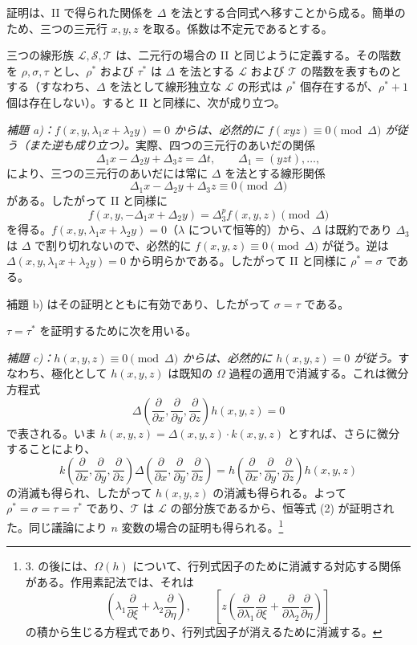 証明は、II で得られた関係を $\Delta$ を法とする合同式へ移すことから成る。簡単のため、三つの三元行 $x,y,z$ を取る。係数は不定元であるとする。

三つの線形族 $\mathcal L,\mathcal S,\mathcal T$ は、二元行の場合の II と同じように定義する。その階数を $\rho,\sigma,\tau$ とし、$\rho^*$ および $\tau^*$ は $\Delta$ を法とする $\mathcal L$ および $\mathcal T$ の階数を表すものとする（すなわち、$\Delta$ を法として線形独立な $\mathcal L$ の形式は $\rho^*$ 個存在するが、$\rho^*+1$ 個は存在しない）。すると II と同様に、次が成り立つ。

\emph{補題 a)：$f(x,y,\lambda_1x+\lambda_2y)=0$ からは、必然的に $f(xyz)\equiv0\pmod{\Delta}$ が従う（また逆も成り立つ）。}実際、四つの三元行のあいだの関係
\[
  \Delta_1x-\Delta_2y+\Delta_3z=\Delta t,
  \qquad \Delta_1=(yzt),\ldots,
\]
により、三つの三元行のあいだには常に $\Delta$ を法とする線形関係
\[
  \Delta_1x-\Delta_2y+\Delta_3z\equiv0\pmod{\Delta}
\]
がある。したがって II と同様に
\[
  f(x,y,-\Delta_1x+\Delta_2y)=\Delta_3^p f(x,y,z)\pmod{\Delta}
\]
を得る。$f(x,y,\lambda_1x+\lambda_2y)=0$（$\lambda$ について恒等的）から、$\Delta$ は既約であり $\Delta_3$ は $\Delta$ で割り切れないので、必然的に $f(x,y,z)\equiv0\pmod{\Delta}$ が従う。逆は $\Delta(x,y,\lambda_1x+\lambda_2y)=0$ から明らかである。したがって II と同様に $\rho^*=\sigma$ である。

補題 b) はその証明とともに有効であり、したがって $\sigma=\tau$ である。

$\tau=\tau^*$ を証明するために次を用いる。

\emph{補題 c)：$h(x,y,z)\equiv0\pmod{\Delta}$ からは、必然的に $h(x,y,z)=0$ が従う。}すなわち、極化として $h(x,y,z)$ は既知の $\Omega$ 過程の適用で消滅する。これは微分方程式
\[
  \Delta\!\left(\frac{\partial}{\partial x},\frac{\partial}{\partial y},\frac{\partial}{\partial z}\right)h(x,y,z)=0
\]
で表される。いま $h(x,y,z)=\Delta(x,y,z)\cdot k(x,y,z)$ とすれば、さらに微分することにより、
\[
  k\!\left(\frac{\partial}{\partial x},\frac{\partial}{\partial y},\frac{\partial}{\partial z}\right)
  \Delta\!\left(\frac{\partial}{\partial x},\frac{\partial}{\partial y},\frac{\partial}{\partial z}\right)
  =
  h\!\left(\frac{\partial}{\partial x},\frac{\partial}{\partial y},\frac{\partial}{\partial z}\right)h(x,y,z)
\]
の消滅も得られ、したがって $h(x,y,z)$ の消滅も得られる。よって $\rho^*=\sigma=\tau=\tau^*$ であり、$\mathcal T$ は $\mathcal L$ の部分族であるから、恒等式 (2) が証明された。同じ議論により $n$ 変数の場合の証明も得られる。\footnote{3. の後には、$\Omega(h)$ について、行列式因子のために消滅する対応する関係がある。作用素記法では、それは
\[
 \left(\lambda_1\frac{\partial}{\partial \xi}+\lambda_2\frac{\partial}{\partial \eta}\right),
 \qquad
 \left[z\left(\frac{\partial}{\partial\lambda_1}\frac{\partial}{\partial \xi}
 +\frac{\partial}{\partial\lambda_2}\frac{\partial}{\partial \eta}\right)\right]
\]
の積から生じる方程式であり、行列式因子が消えるために消滅する。}

